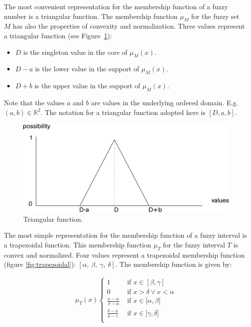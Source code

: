 \documentclass[twoside,twocolumn,a4paper]{article}
\begin{document}
The most convenient representation for the membership function of a fuzzy number is a triangular function. The membership function $\mu_M$ for the fuzzy set $M$ has also the properties of convexity and normalization. Three values represent a triangular function (see Figure~\ref{fig:triangular}):
\begin{itemize}
\item
$D$ is the singleton value in the core of $\mu_M(x)$.
\item
$D-a$ is the lower value in the support of $\mu_M(x)$. 
\item
$D+b$ is the upper value in the support of $\mu_M(x)$.
\end{itemize}
Note that the values $a$ and $b$ are values in the underlying ordered domain. E.g. $(a,b) \in \mathbb{R}^2$. The notation for a triangular function adopted here is $[D,a,b]$.
\begin{figure}[h!]
  \centering
  \includegraphics[scale=0.4]{graphs/triangular.pdf}
  \caption{Triangular function.}
  \label{fig:triangular}
\end{figure}

The most simple representation for the membership function of a fuzzy interval is a trapezoidal function. This membership function $\mu_T$ for the fuzzy interval $T$ is convex and normalized. Four values represent a trapezoidal membership function (figure  \ref{fig:trapezoidal}): $\left[\alpha,\ \beta,\ \gamma,\ \delta\right]$. The membership function is given by:

\begin{align}
\mu_T(x)
\begin{cases}
1 & \mbox{ if } x \in [\beta,\gamma] \\
0 & \mbox{ if } x > \delta \vee x < \alpha \\
\frac{x-\alpha}{\beta - \alpha} & \mbox{ if } x \in [\alpha,\beta[ \\
\frac{\delta -x}{\delta - \gamma} & \mbox{ if } x \in ]\gamma,\delta] \\
\end{cases}
\end{align}
\end{document}
